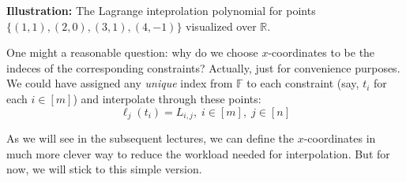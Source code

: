 \documentclass[../lecture-notes-148x210.tex]{subfiles}
\begin{document}
\begin{example}
    \begin{center}

        \textbf{Illustration:} The Lagrange inteprolation polynomial for points $\{(1,1), (2,0), (3,1), (4,-1)\}$ visualized over $\mathbb{R}$.
    \end{center}
\end{example}

\begin{remark}
    One might a reasonable question: why do we choose $x$-coordinates to be the
    indeces of the corresponding constraints? Actually, just for convenience
    purposes. We could have assigned any \textit{unique} index from $\mathbb{F}$
    to each constraint (say, $t_i$ for each $i \in [m]$) and interpolate through
    these points:
    \begin{equation*}
        \ell_j(t_i) = L_{i,j}, \; i \in [m], \; j \in [n]
    \end{equation*}

    As we will see in the subsequent lectures, we can define the $x$-coordinates
    in much more clever way to reduce the workload needed for interpolation. But
    for now, we will stick to this simple version.
\end{remark}
\end{document}
